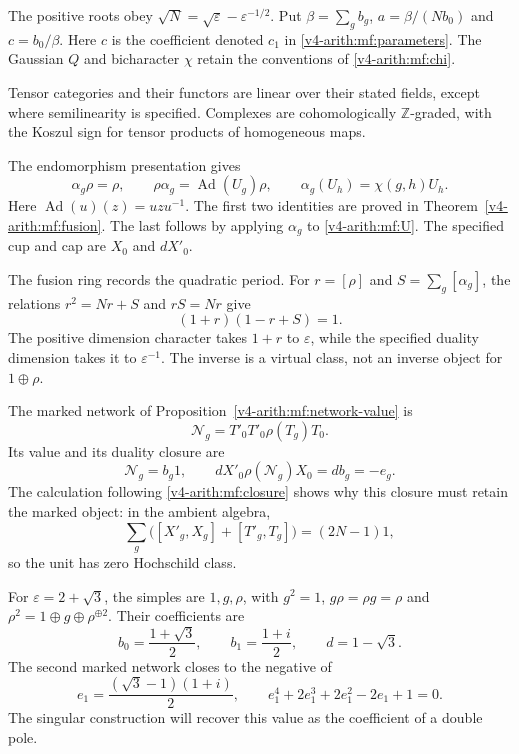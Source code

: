 The positive roots obey
\(\sqrt N=\sqrt\varepsilon-\varepsilon^{-1/2}\).
Put \(\beta=\sum_gb_g\), \(a=\beta/(Nb_0)\) and
\(c=b_0/\beta\). Here \(c\) is the coefficient denoted \(c_1\) in \eqref{v4-arith:mf:parameters}. The Gaussian \(Q\) and bicharacter \(\chi\)
retain the conventions of \eqref{v4-arith:mf:chi}.

Tensor categories and their functors are linear over their stated
fields, except where semilinearity is specified. Complexes are
cohomologically \(\mathbb Z\)-graded, with the Koszul sign for tensor
products of homogeneous maps.

The endomorphism presentation gives
\begin{equation}\label{v4-arith:asi:fusion-identities}
 \alpha_g\rho=\rho,\qquad
 \rho\alpha_g=\operatorname{Ad}(U_g)\rho,\qquad
 \alpha_g(U_h)=\chi(g,h)U_h.
\end{equation}
Here \(\operatorname{Ad}(u)(z)=uzu^{-1}\). The first two identities
are proved in Theorem~\ref{v4-arith:mf:fusion}. The last follows by
applying \(\alpha_g\) to \eqref{v4-arith:mf:U}.
The specified cup and cap are \(X_0\) and \(dX'_0\).

The fusion ring records the quadratic period. For
\(r=[\rho]\) and \(S=\sum_g[\alpha_g]\), the relations
\(r^2=Nr+S\) and \(rS=Nr\) give
\[
 (1+r)(1-r+S)=1.
\]
The positive dimension character takes \(1+r\) to
\(\varepsilon\), while the specified duality dimension takes it to
\(\varepsilon^{-1}\). The inverse is a virtual class, not an inverse
object for \(1\oplus\rho\).

The marked network of Proposition~\ref{v4-arith:mf:network-value} is
\begin{equation}\label{v4-arith:asi:network}
 \mathcal N_g=T'_0T'_0\rho(T_g)T_0.
\end{equation}
Its value and its duality closure are
\begin{equation}\label{v4-arith:asi:closed-network}
 \mathcal N_g=b_g1,\qquad
 dX'_0\rho(\mathcal N_g)X_0=db_g=-e_g.
\end{equation}
The calculation following \eqref{v4-arith:mf:closure} shows why this closure must
retain the marked object: in the ambient algebra,
\begin{equation}\label{v4-arith:asi:HH-unit}
 \sum_g\bigl([X'_g,X_g]+[T'_g,T_g]\bigr)=(2N-1)1,
\end{equation}
so the unit has zero Hochschild class.

For \(\varepsilon=2+\sqrt3\), the simples are \(1,g,\rho\), with
\(g^2=1\), \(g\rho=\rho g=\rho\) and
\(\rho^2=1\oplus g\oplus\rho^{\oplus2}\). Their coefficients are
\[
 b_0=\frac{1+\sqrt3}{2},\qquad b_1=\frac{1+i}{2},\qquad d=1-\sqrt3.
\]
The second marked network closes to the negative of
\begin{equation}\label{v4-arith:asi:example-unit}
 e_1=\frac{(\sqrt3-1)(1+i)}2,
 \qquad e_1^4+2e_1^3+2e_1^2-2e_1+1=0.
\end{equation}
The singular construction will recover this value as the coefficient
of a double pole.

